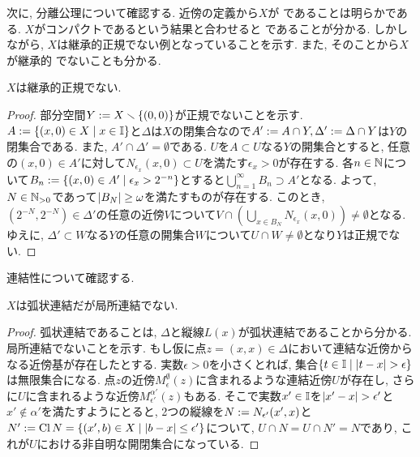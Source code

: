 \documentclass[uplatex, dvipdfmx, a4paper, 12pt, class=jsbook, crop=false]{standalone}
\begin{document}
次に, 分離公理について確認する. 近傍の定義から$ X $が \Hausdorff であることは明らかである. $ X $がコンパクトであるという結果と合わせると  であることが分かる. しかしながら, $ X $は継承的正規でない例となっていることを示す. また, そのことから$ X $が継承的 \Lindelof でないことも分かる.

\begin{proposition}
	$ X $は継承的正規でない.
\end{proposition}

\begin{proof}
	部分空間$ Y \mathrel{:=} X \smallsetminus \{(0,0)\} $が正規でないことを示す. $ A \defeq \setcomp{(x, 0) \in X}{x \in \I} $と$ \Delta $は$ X $の閉集合なので$ A' \mathrel{:=} A \cap Y, \Delta' \mathrel{:=} \Delta \cap Y $は$ Y $の閉集合である. また, $ A' \cap \Delta' = \emptyset $である. $ U $を$ A \subset U $なる$ Y $の開集合とすると, 任意の$ (x, 0) \in A' $に対して$ N_{\epsilon_x}(x, 0) \subset U $を満たす$ \epsilon_x > 0 $が存在する. 各$ n \in \mathbb{N} $について$ B_n \defeq \setcomp{(x, 0) \in A'}{\epsilon_x > 2^{-n}} $とすると$ \bigcup_{n = 1}^\infty B_n \supset A' $となる. よって, $ N \in \mathbb{N}_{>0} $であって$ \left|B_N\right| \geq \omega $を満たすものが存在する. このとき, $ (2^{-N}, 2^{-N}) \in \Delta' $の任意の近傍$ V $について$ V \cap (\bigcup_{x \in B_N}N_{\epsilon_x}(x,0)) \neq \emptyset $となる. ゆえに, $ \Delta' \subset W $なる$ Y $の任意の開集合$ W $について$ U \cap W \neq \emptyset $となり$ Y $は正規でない.
\end{proof}

連結性について確認する.

\begin{proposition}
	$ X $は弧状連結だが局所連結でない.
\end{proposition}

\begin{proof}
	弧状連結であることは, $ \Delta $と縦線$ L(x) $が弧状連結であることから分かる. 局所連結でないことを示す. もし仮に点$ z = (x, x) \in \Delta $において連結な近傍からなる近傍基が存在したとする. 実数$ \epsilon > 0 $を小さくとれば, 集合$ \setcomp{t \in \I}{\abs{t - x} > \epsilon} $は無限集合になる. 点$ z $の近傍$ M^{\emptyset}_{\epsilon} (z) $に含まれるような連結近傍$ U $が存在し, さらに$ U $に含まれるような近傍$ M^{\alpha'}_{\epsilon'} (z) $もある. そこで実数$ x' \in \mathbb{I} $を$ \left|x' -x\right| > \epsilon' $と$ x' \not\in \alpha' $を満たすようにとると, 2つの縦線を$ N \mathrel{:=} N_{\epsilon'} (x', x) $と$ N' \defeq \topcl{N} = \setcomp{(x', b) \in X}{\abs{b-x} \leq \epsilon'} $について, $ U \cap N = U \cap N' = N $であり, これが$ U $における非自明な開閉集合になっている.
\end{proof}
\end{document}
